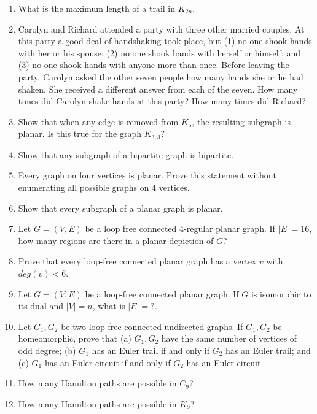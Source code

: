 \documentclass[a4paper]{article}
\begin{document}
\begin{enumerate}
\item What is the maximum length of a trail in $K_{2n}$.


\item Carolyn and Richard attended a party with three other married couples. At this party a good deal of handshaking took place, but (1) no one shook hands with her or his spouse; (2) no one shook hands with herself or himself; and (3) no one shook hands with anyone more than once. Before leaving the party, Carolyn asked the other seven people how many hands she or he had shaken. She received a different answer from each of the seven. How many times did Carolyn shake hands at this party? How many times did Richard?

\item Show that when any edge is removed from $K_5$, the resulting subgraph is planar. Is this true for the graph $K_{3,3}$?

\item Show that any subgraph of a bipartite graph is bipartite.

\item Every graph on four vertices is planar. Prove this statement without enumerating all possible graphs on 4 vertices.

\item Show that every subgraph of a planar graph is planar. 

\item Let $G=(V,E)$ be a loop free connected 4-regular planar graph. If $|E|=16$, how many regions are there in a planar depiction of $G$?

\item Prove that every loop-free connected planar graph has a vertex $v$ with $deg(v)<6$.

\item Let $G=(V,E)$ be a loop-free connected planar graph. If $G$ is isomorphic to its dual and $|V|=n$, what is $|E|=?$.

\item Let $G_1,G_2$ be two loop-free connected undirected graphs. If $G_1,G_2$ be homeomorphic, prove that (a) $G_1,G_2$ have the same number of vertices of odd degree; (b) $G_1$ has an Euler trail if and only if $G_2$ has an Euler trail; and (c) $G_1$ has an Euler circuit if and only if $G_2$ has an Euler circuit.

\item How many Hamilton paths are possible in $C_9$?

\item How many Hamilton paths are possible in $K_9$?


\end{enumerate}
\end{document}
